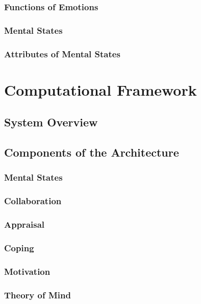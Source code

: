 \documentclass[12pt]{report}
\begin{document}
\subsection{Functions of Emotions}

\subsection{Mental States}

\subsection{Attributes of Mental States}

\chapter{Computational Framework}
\label{ch:framework}

\section{System Overview}

\section{Components of the Architecture}

\subsection{Mental States}

\subsection{Collaboration}

\subsection{Appraisal}

\subsection{Coping}

\subsection{Motivation}

\subsection{Theory of Mind}
\end{document}
